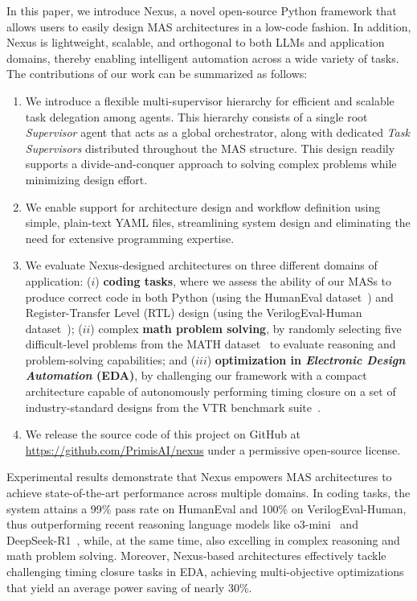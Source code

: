 In this paper, we introduce Nexus, a novel open-source Python framework that allows users to easily design MAS architectures in a low-code fashion. In addition, Nexus is lightweight, scalable, and orthogonal to both LLMs and application domains, thereby enabling intelligent automation across a wide variety of tasks. The contributions of our work can be summarized as follows:

\begin{enumerate}[noitemsep]
\item We introduce a flexible multi-supervisor hierarchy for efficient and scalable task delegation among agents. This hierarchy consists of a single root {\em Supervisor} agent that acts as a global orchestrator, along with dedicated {\em Task Supervisors} distributed throughout the MAS structure. This design readily supports a divide-and-conquer approach to solving complex problems while minimizing design effort.
\item We enable support for architecture design and workflow definition using simple, plain-text YAML files, streamlining system design and eliminating the need for extensive programming expertise.
\item We evaluate Nexus-designed architectures on three different domains of application: ($i$) {\bf coding tasks}, where we assess the ability of our MASs to produce correct code in both Python (using the HumanEval dataset~\cite{chen2021evaluating}) and Register-Transfer Level (RTL) design (using the VerilogEval-Human dataset~\cite{liu2023verilogeval}); ($ii$) complex {\bf math problem solving}, by randomly selecting five difficult-level problems from the MATH dataset~\cite{hendrycks2021measuring} to evaluate reasoning and problem-solving capabilities; and ($iii$) {\bf optimization in {\em Electronic Design Automation} (EDA)}, by challenging our framework with a compact architecture capable of autonomously performing timing closure on a set of industry-standard designs from the VTR benchmark suite~\cite{murray2020vtr}.
\item We release the source code of this project on GitHub at \url{https://github.com/PrimisAI/nexus} under a permissive open-source license.
\end{enumerate}

Experimental results demonstrate that Nexus empowers MAS architectures to achieve state-of-the-art performance across multiple domains. In coding tasks, the system attains a 99\% pass rate on HumanEval and 100\% on VerilogEval-Human, thus outperforming recent reasoning language models like o3-mini~\cite{o3mini} and DeepSeek-R1~\cite{guo2025deepseek}, while, at the same time, also excelling in complex reasoning and math problem solving. Moreover, Nexus-based architectures effectively tackle challenging timing closure tasks in EDA, achieving multi-objective optimizations that yield an average power saving of nearly 30\%.

